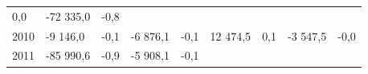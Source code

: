\begin{longtable}[]{@{}lllllllll@{}}
\begin{minipage}[t]{0.06\columnwidth}
0,0\strut
\end{minipage} & \begin{minipage}[t]{0.09\columnwidth}\raggedright
-72 335,0\strut
\end{minipage} & \begin{minipage}[t]{0.06\columnwidth}\raggedright
-0,8\strut
\end{minipage}\tabularnewline
\begin{minipage}[t]{0.05\columnwidth}\raggedright
2010\strut
\end{minipage} & \begin{minipage}[t]{0.10\columnwidth}\raggedright
-9 146,0\strut
\end{minipage} & \begin{minipage}[t]{0.06\columnwidth}\raggedright
-0,1\strut
\end{minipage} & \begin{minipage}[t]{0.16\columnwidth}\raggedright
-6 876,1\strut
\end{minipage} & \begin{minipage}[t]{0.06\columnwidth}\raggedright
-0,1\strut
\end{minipage} & \begin{minipage}[t]{0.12\columnwidth}\raggedright
12 474,5\strut
\end{minipage} & \begin{minipage}[t]{0.06\columnwidth}\raggedright
0,1\strut
\end{minipage} & \begin{minipage}[t]{0.09\columnwidth}\raggedright
-3 547,5\strut
\end{minipage} & \begin{minipage}[t]{0.06\columnwidth}\raggedright
-0,0\strut
\end{minipage}\tabularnewline
\begin{minipage}[t]{0.05\columnwidth}\raggedright
2011\strut
\end{minipage} & \begin{minipage}[t]{0.10\columnwidth}\raggedright
-85 990,6\strut
\end{minipage} & \begin{minipage}[t]{0.06\columnwidth}\raggedright
-0,9\strut
\end{minipage} & \begin{minipage}[t]{0.16\columnwidth}\raggedright
-5 908,1\strut
\end{minipage} & \begin{minipage}[t]{0.06\columnwidth}\raggedright
-0,1\strut
\end{minipage} & \begin{minipage}[t]{0.12\columnwidth}\raggedright

\end{minipage}
\end{longtable}
